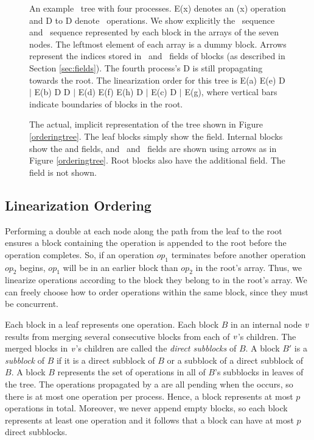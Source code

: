 \begin{figure*}[t]

\caption{An example \ordering\ tree with four processes. 
E(x) denotes an \enqueue(x) operation and D to D denote \dequeue\ operations.
We show explicitly the \enqueue\ sequence and \dequeue\ sequence represented by each block in the  arrays of the seven nodes.  The leftmost element of each  array is a dummy block.
Arrows represent the indices stored in \eleft\ and \eright\ fields of blocks (as described in Section \ref{sec:fields}).
The fourth process's D is still propagating towards the root.
The linearization order for this tree is
E(a) E(e) D $\mid$ E(b) D D $\mid$ E(d) E(f) E(h) D $\mid$ E(c) D $\mid$ E(g), where vertical bars indicate boundaries of blocks in the root.\label{orderingtree}}
\medskip

\caption{\label{implicit}The actual, implicit representation of the tree shown in Figure \ref{orderingtree}.
The leaf blocks simply show the  field.
Internal blocks show the  and  fields,
and \eleft\ and \eright\ fields are shown using arrows as in Figure \ref{orderingtree}.
Root blocks also have the additional  field.
The  field is not shown.}
\end{figure*}

\subsection{Linearization Ordering}

Performing a double  at each node along the path from the leaf to the root ensures 
a block containing the operation is appended to the root before the operation completes.
So, if an operation $op_1$ terminates before another operation $op_2$ begins, 
$op_1$ will be in an earlier block than $op_2$ in the root's  array.
Thus, we linearize operations according to the block they belong to in the root's array.
We can freely choose how to order operations within the same block, since they must be concurrent.

Each block in a leaf represents one operation.
Each block $B$ in an internal node $\mbox{\textnormal{\textit{v}}}$ results from merging
several consecutive blocks from each of $\mbox{\textnormal{\textit{v}}}$'s children.
The merged blocks in $\mbox{\textnormal{\textit{v}}}$'s children are called the \emph{direct subblocks} of $B$.
A block $B'$ is a \emph{subblock} of $B$ if it is a direct subblock of $B$
or a subblock of a direct subblock of $B$.
A block $B$ represents the set of operations in all of $B$'s subblocks in leaves of the tree.
The operations propagated by a  are all pending when the  occurs,
so there is at most one operation per process.
Hence, a block represents at most $p$ operations in total.  
Moreover, we never append empty blocks, so 
each block represents at least one operation and it follows that a block can have at most $p$ direct subblocks.

